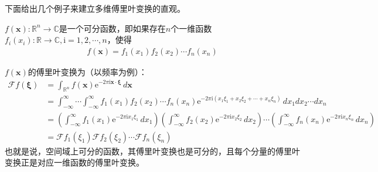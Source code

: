 下面给出几个例子来建立多维傅里叶变换的直观。
\begin{definition}[可分函数]
    $f(\mathbf{x}):\mathbb{R}^n\to\mathbb{C}$是一个可分函数，即如果存在$n$个一维函数$f_i(x_i):\mathbb{R}\to\mathbb{C},\mathrm{i}=1,2,\cdots,n$，使得
    \begin{align*}
        f(\mathbf{x})=f_1(x_1)f_2(x_2)\cdots f_n(x_n)
    \end{align*}
\end{definition}
$f(\mathbf{x})$的傅里叶变换为（以频率为例）：
{\color{blue}
\begin{align*}
\mathcal{F} f(\boldsymbol{\xi})&=\int_{\mathbb{R}^n}f(\mathbf{x})\mathrm{e}^{-2\pi \mathrm{i} \mathbf{x}\cdot\boldsymbol{\xi}}\,d\mathbf{x}\\
&=\int_{-\infty}^{\infty}\cdots \int_{-\infty}^{\infty}f_1(x_1)f_2(x_2)\cdots f_n(x_n)\mathrm{e}^{-2\pi \mathrm{i} (x_1\xi_1+x_2\xi_2+\cdots +x_n\xi_n)}\,dx_1 dx_2\cdots dx_n\\
&=\left(\int_{-\infty}^{\infty}f_1(x_1)\mathrm{e}^{-2\pi \mathrm{i} x_1\xi_1}\,dx_1\right)\left(\int_{-\infty}^{\infty}f_2(x_2)\mathrm{e}^{-2\pi \mathrm{i} x_2\xi_2}\,dx_2\right)\cdots \left(\int_{-\infty}^{\infty}f_n(x_n)\mathrm{e}^{-2\pi \mathrm{i} x_n\xi_n}\,dx_n\right)\\
&=\mathcal{F} f_1(\xi_1)\mathcal{F} f_2(\xi_2)\cdots \mathcal{F} f_n(\xi_n)
\end{align*}}
也就是说，空间域上可分的函数，其傅里叶变换也是可分的，且每个分量的傅里叶变换正是对应一维函数的傅里叶变换。

